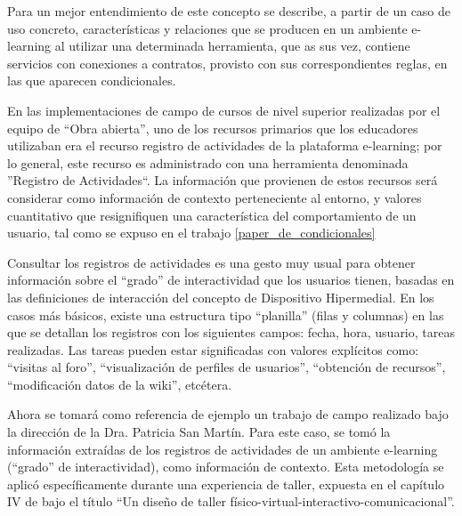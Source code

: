 \begin{itemize}
Para un mejor entendimiento de este concepto se describe, a partir de un caso de uso concreto, características y relaciones que se producen en un ambiente e-learning al utilizar una determinada herramienta, que as sus vez, contiene servicios con conexiones a contratos, provisto con sus correspondientes reglas, en las que aparecen condicionales.  


En las implementaciones de campo de cursos de nivel superior realizadas por
el equipo de “Obra abierta”, uno de los recursos primarios que los educadores
utilizaban era el recurso registro de actividades de la plataforma e-learning; por lo general, este recurso es administrado con una herramienta denominada ''Registro de Actividades``.  La información que provienen de estos recursos será considerar como información de contexto perteneciente al entorno, y valores cuantitativo que resignifiquen una característica del comportamiento de un usuario, tal como se expuso en el trabajo \ref{paper_de_condicionales} 


Consultar los registros de actividades es una gesto muy usual para obtener
información sobre el “grado” de interactividad que los usuarios \cite{arqDHD3} tienen, basadas en las definiciones de interacción del concepto de Dispositivo Hipermedial. En los casos más básicos, existe una estructura tipo “planilla” (filas y columnas) en las que se detallan los registros con los siguientes campos: fecha, hora, usuario, tareas realizadas. Las tareas pueden estar significadas con valores explícitos como: “visitas al foro”, “visualización de perfiles de usuarios”, “obtención de recursos”, “modificación datos de la wiki”, etcétera.

Ahora se tomará como referencia de ejemplo un trabajo de campo realizado bajo la dirección de la Dra. Patricia San Martín. Para este caso, se tomó la información extraídas de los registros de actividades de un ambiente e-learning (“grado” de interactividad), como información de contexto. Esta metodología se aplicó específicamente durante una experiencia de taller, expuesta en el capítulo IV de \cite{DHD} bajo el título “Un diseño de taller físico-virtual-interactivo-comunicacional”.


\end{itemize}
